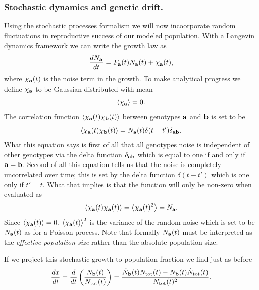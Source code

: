 \subsubsection{Stochastic dynamics and genetic drift.}

Using the stochastic processes formalism we will now incoorporate random
fluctuations in reproductive success of our modeled population. With a Langevin
dynamics framework we can write the growth law as
\begin{equation}
  {d{N_{\mathbf{a}}} \over dt} = F_{\mathbf{a}}(t) N_{\mathbf{a}}(t) + \chi_{\mathbf{a}}(t),
\end{equation}
where $\chi_{\mathbf{a}}(t)$ is the noise term in the growth. To make analytical
progress we define $\chi_{\mathbf{a}}$ to be Gaussian distributed with mean
\begin{equation}
  \left\langle \chi_{\mathbf{a}} \right\rangle = 0.
\end{equation}
The correlation function $\left\langle \chi_{\mathbf{a}}(t) \chi_{\mathbf{b}}(t) \right\rangle$ between
genotypes $\mathbf{a}$ and $\mathbf{b}$ is set to be
\begin{equation}
  \left\langle \chi_{\mathbf{a}}(t) \chi_{\mathbf{b}}(t) \right\rangle = N_{\mathbf{a}}(t)
                                           \delta(t - t') \delta_{\mathbf{ab}}.
\end{equation}
What this equation says is first of all that all genotypes noise is independent
of other genotypes via the delta function $\delta_{\mathbf{ab}}$ which is equal to one
if and only if $\mathbf{a} = \mathbf{b}$. Second of all this equation tells us that the
noise is completely uncorrelated over time; this is set by the delta function
$\delta(t - t')$ which is one only if $t' = t$. What that implies is that the
function will only be non-zero when evaluated as
\begin{equation}
  \left\langle \chi_{\mathbf{a}}(t) \chi_{\mathbf{a}}(t) \right\rangle = \left\langle \chi_{\mathbf{a}}(t)^2 \right\rangle = N_{\mathbf{a}}.
\end{equation}
Since $\left\langle \chi_{\mathbf{a}}(t) \right\rangle = 0$, $\left\langle \chi_{\mathbf{a}}(t) \right\rangle^2$ is the variance
of the random noise which is set to be $N_{\mathbf{a}}(t)$ as for a Poisson process.
Note that formally $N_{\mathbf{a}}(t)$ must be interpreted as the {\it effective
population size} rather than the absolute population size.

If we project this stochastic growth to population fraction we find just as
before
\begin{equation}
  {d{x} \over dt} = {d{} \over dt}\left( {N_{\mathbf{b}}(t) \over N_{\text{tot}}(t)} \right) =
  {\dot{N}_{\mathbf{b}}(t) N_{\text{tot}}(t) - N_{\mathbf{b}}(t) \dot{N}_{\text{tot}}(t) \over
     N_{\text{tot}}(t)^2}.
\end{equation}

